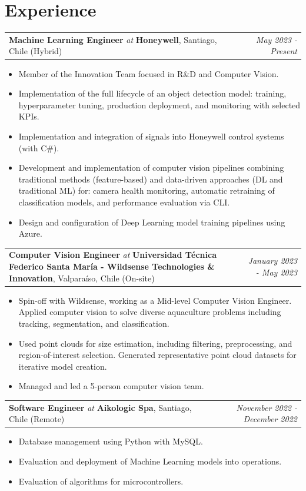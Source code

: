 \documentclass[11pt, letterpaper]{article}
\makeatletter
\newcommand{\experience}[5]{%
  \noindent
  \begin{tabularx}{\linewidth}{@{}X r@{}}
    \textbf{#1} \textit{at} \textbf{#2}, #3 & \textit{#4}
  \end{tabularx}
  \vspace{-10pt}
  #5
  \vspace{2pt}
}
\makeatother
\begin{document}
\section{Experience}
\experience
  {Machine Learning Engineer}
  {Honeywell}
  {Santiago, Chile (Hybrid)}
  {May 2023 - Present}
  {
    \begin{itemize}
      \item Member of the Innovation Team focused in R\&D and Computer Vision.
      \item Implementation of the full lifecycle of an object detection model: training, hyperparameter tuning, production deployment, and monitoring with selected KPIs.
      \item Implementation and integration of signals into Honeywell control systems (with C\#).
      \item Development and implementation of computer vision pipelines combining traditional methods (feature-based) and data-driven approaches (DL and traditional ML) for: camera health monitoring, automatic retraining of classification models, and performance evaluation via CLI.
      \item Design and configuration of Deep Learning model training pipelines using Azure.
    \end{itemize}
  }
\experience
  {Computer Vision Engineer}
  {Universidad T\'ecnica Federico Santa Mar\'ia - Wildsense Technologies \& Innovation}
  {Valpara\'iso, Chile (On-site)}
  {January 2023 - May 2023}
  {
    \begin{itemize}
        \item Spin-off with Wildsense, working as a Mid-level Computer Vision Engineer. Applied computer vision to solve diverse aquaculture problems including tracking, segmentation, and classification.
        \item Used point clouds for size estimation, including filtering, preprocessing, and region-of-interest selection. Generated representative point cloud datasets for iterative model creation.
        \item Managed and led a 5-person computer vision team.
    \end{itemize}
  }
\experience
  {Software Engineer}
  {Aikologic Spa}
  {Santiago, Chile (Remote)}
  {November 2022 - December 2022}
  {
    \begin{itemize}
        \item Database management using Python with MySQL.
        \item Evaluation and deployment of Machine Learning models into operations.
        \item Evaluation of algorithms for microcontrollers.
    \end{itemize}
  }
\end{document}
